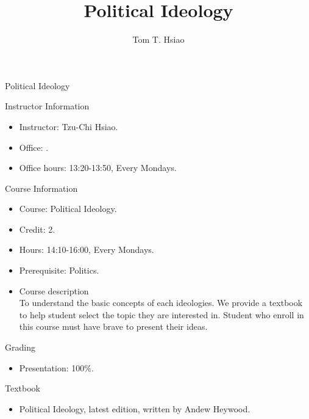 \documentclass{article}
\title{Political Ideology}
\author{Tom T. Hsiao}
\date{}
\begin{document}
\begin{center}
\fontsize{16pt}{16pt}\selectfont Political Ideology \\
\end{center}
\fontsize{14pt}{14pt}\selectfont
\begin{flushleft}
Instructor Information
\end{flushleft}
\begin{itemize}
\item Instructor: Tzu-Chi Hsiao. \\
\item Office: . \\
\item Office hours: 13:20-13:50, Every Mondays. \\
\end{itemize}
Course Information \\
\begin{itemize}
\item Course: Political Ideology. \\
\item Credit: 2. \\
\item Hours: 14:10-16:00, Every Mondays. \\
\item Prerequisite: Politics. \\
\item Course description \\
To understand the basic concepts of each ideologies. We provide a textbook to help student select the topic they are interested in. Student who enroll in this course must have brave to present their ideas. \\
\end{itemize}
\begin{flushleft}
Grading \\
\end{flushleft}
\begin{itemize}
\item Presentation: 100\%. \\
\end{itemize}
Textbook \\
\begin{itemize}
\item Political Ideology, latest edition, written by Andew Heywood. \\
\end{itemize}
\end{document}
